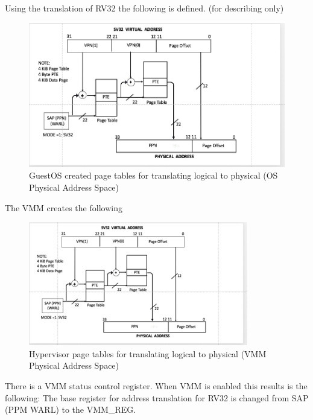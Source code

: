 \documentclass{article}
\begin{document}
Using the translation of RV32 the following is defined. (for describing only)

\begin{figure}
\begin{center}
\includegraphics[scale = .4]
{figures/figure7_rv32_pte.jpg}
\caption{GuestOS created page tables for translating logical to  physical (OS Physical Address Space)\label{fig:guest-logical-physical}}
\end{center}
\end{figure}


The VMM creates the following


\begin{figure}
\begin{center}
\includegraphics[scale = .9]
{figures/figure8_hypervisor_page_table.jpg}
\caption{Hypervisor  page tables for translating logical to physical (VMM Physical Address Space)}
\label{fig:hypervisor pagetables}
\end{center}
\end{figure}

There is a VMM status  control register.  When VMM is enabled this results is the following: The base register for address translation for RV32 is changed from SAP (PPM WARL)  to the VMM\_REG. 
\end{document}
